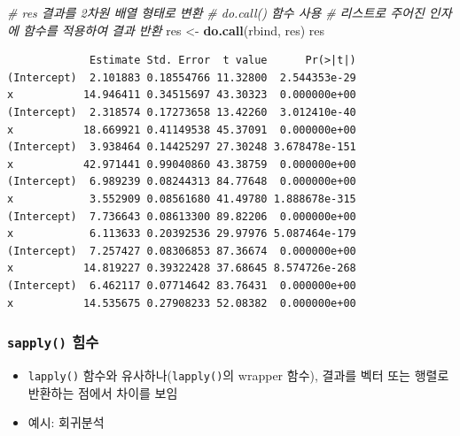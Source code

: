 \documentclass[
  11pt,
]{krantz}
\newenvironment{Shaded}{\begin{snugshade}}{\end{snugshade}}
\newcommand{\CommentTok}[1]{\textcolor[rgb]{0.37,0.37,0.37}{\textit{#1}}}
\newcommand{\ControlFlowTok}[1]{\textcolor[rgb]{0.27,0.27,0.27}{\textbf{#1}}}
\newcommand{\DecValTok}[1]{\textcolor[rgb]{0.06,0.06,0.06}{#1}}
\newcommand{\KeywordTok}[1]{\textcolor[rgb]{0.27,0.27,0.27}{\textbf{#1}}}
\newcommand{\NormalTok}[1]{#1}
\newcommand{\OperatorTok}[1]{\textcolor[rgb]{0.43,0.43,0.43}{\textbf{#1}}}
\newcommand{\StringTok}[1]{\textcolor[rgb]{0.5,0.5,0.5}{#1}}
\providecommand{\tightlist}{%
  \setlength{\itemsep}{0pt}\setlength{\parskip}{0pt}}
\begin{document}
\begin{Shaded}
\begin{Highlighting}[]
\CommentTok{# res 결과를 2차원 배열 형태로 변환}
\CommentTok{# do.call() 함수 사용}
\CommentTok{# 리스트로 주어진 인자에 함수를 적용하여 결과 반환}
\NormalTok{res <-}\StringTok{ }\KeywordTok{do.call}\NormalTok{(rbind, res)  }
\NormalTok{res}
\end{Highlighting}
\end{Shaded}

\begin{verbatim}
             Estimate Std. Error  t value      Pr(>|t|)
(Intercept)  2.101883 0.18554766 11.32800  2.544353e-29
x           14.946411 0.34515697 43.30323  0.000000e+00
(Intercept)  2.318574 0.17273658 13.42260  3.012410e-40
x           18.669921 0.41149538 45.37091  0.000000e+00
(Intercept)  3.938464 0.14425297 27.30248 3.678478e-151
x           42.971441 0.99040860 43.38759  0.000000e+00
(Intercept)  6.989239 0.08244313 84.77648  0.000000e+00
x            3.552909 0.08561680 41.49780 1.888678e-315
(Intercept)  7.736643 0.08613300 89.82206  0.000000e+00
x            6.113633 0.20392536 29.97976 5.087464e-179
(Intercept)  7.257427 0.08306853 87.36674  0.000000e+00
x           14.819227 0.39322428 37.68645 8.574726e-268
(Intercept)  6.462117 0.07714642 83.76431  0.000000e+00
x           14.535675 0.27908233 52.08382  0.000000e+00
\end{verbatim}

\normalsize

\hypertarget{sapply}{%
\subsubsection*{\texorpdfstring{\texttt{sapply()} 힘수}{sapply() 힘수}}\label{sapply}}


\begin{itemize}
\tightlist
\item
  \texttt{lapply()} 함수와 유사하나(\texttt{lapply()}의 wrapper 함수), 결과를 벡터 또는 행렬로 반환하는 점에서 차이를 보임
\item
  예시: 회귀분석
\end{itemize}

\footnotesize

\begin{Shaded}
\end{Shaded}
\end{document}
